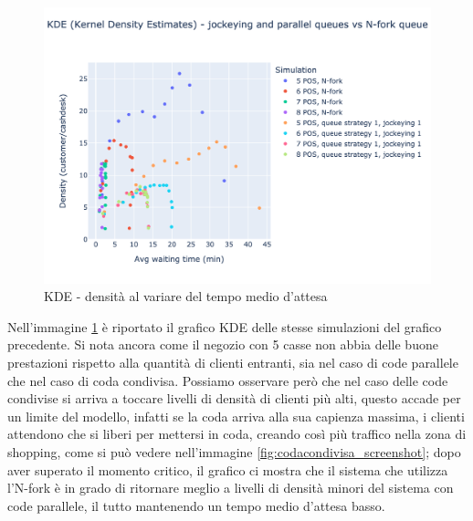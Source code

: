 \begin{figure}[H]
	\centering
	\includegraphics[width=12cm]{"images/results/kde_codacondivisa.png"}
	
	\caption{KDE - densità al variare del tempo medio d'attesa}
	\label{fig:kde_codacondivisa}
\end{figure}

Nell'immagine \ref{fig:kde_codacondivisa} è riportato il grafico KDE delle stesse simulazioni del grafico precedente. Si nota ancora come il negozio con 5 casse non abbia delle buone prestazioni rispetto alla quantità di clienti entranti, sia nel caso di code parallele che nel caso di coda condivisa. Possiamo osservare però che nel caso delle code condivise si arriva a toccare livelli di densità di clienti più alti, questo accade per un limite del modello, infatti se la coda arriva alla sua capienza massima, i clienti attendono che si liberi per mettersi in coda, creando così più traffico nella zona di shopping, come si può vedere nell'immagine \ref{fig:codacondivisa_screenshot}; dopo aver superato il momento critico, il grafico ci mostra che il sistema che utilizza l'N-fork è in grado di ritornare meglio a livelli di densità minori del sistema con code parallele, il tutto mantenendo un tempo medio d'attesa basso.

